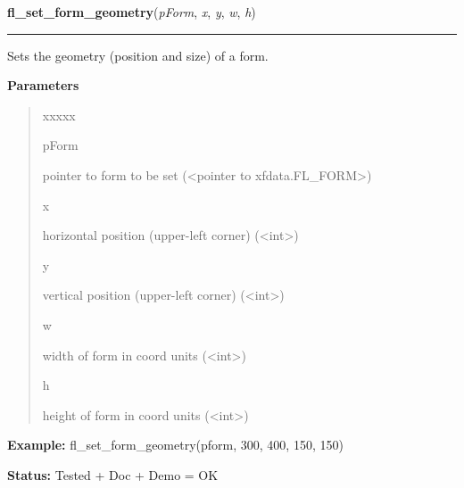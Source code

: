 \hspace{.8\funcindent}\begin{boxedminipage}{\funcwidth}

    \raggedright \textbf{fl\_set\_form\_geometry}(\textit{pForm}, \textit{x}, \textit{y}, \textit{w}, \textit{h})

    \vspace{-1.5ex}

    \rule{\textwidth}{0.5\fboxrule}
\setlength{\parskip}{2ex}
    Sets the geometry (position and size) of a form.

\setlength{\parskip}{1ex}
      \textbf{Parameters}
      \vspace{-1ex}

      \begin{quote}
        \begin{Ventry}{xxxxx}

          \item[pForm]

          pointer to form to be set ({\textless}pointer to 
          xfdata.FL\_FORM{\textgreater})

          \item[x]

          horizontal position (upper-left corner) 
          ({\textless}int{\textgreater})

          \item[y]

          vertical position (upper-left corner) 
          ({\textless}int{\textgreater})

          \item[w]

          width of form in coord units ({\textless}int{\textgreater})

          \item[h]

          height of form in coord units ({\textless}int{\textgreater})

        \end{Ventry}

      \end{quote}

\textbf{Example:} fl\_set\_form\_geometry(pform, 300, 400, 150, 150)



\textbf{Status:} Tested + Doc + Demo = OK



    \end{boxedminipage}

